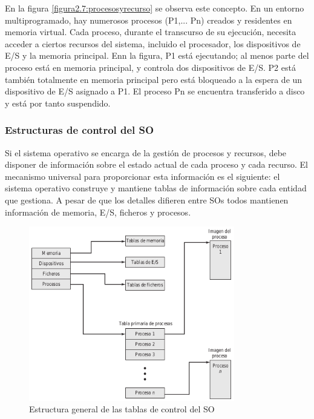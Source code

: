 \documentclass{article}
\begin{document}
			En la figura \ref{figura2.7:procesosyrecurso} se observa este concepto. En un entorno multiprogramado, hay numerosos procesos (P1,... Pn) creados y residentes en memoria virtual. Cada proceso, durante el transcurso de su ejecución, necesita acceder a ciertos recursos del sistema, incluido el procesador, los dispositivos de E/S y la memoria principal. Enn la figura, P1 está ejecutando; al menos parte del proceso está en memoria principal, y controla dos dispositivos de E/S. P2 está también totalmente en memoria principal pero está bloqueado a la espera de un dispositivo de E/S asignado a P1. El proceso Pn se encuentra transferido a disco y está por tanto suspendido.
			
			\subsubsection{Estructuras de control del SO}
				Si el sistema operativo se encarga de la gestión de procesos y recursos, debe disponer de información sobre el estado actual de cada proceso y cada recurso. El mecanismo universal para proporcionar esta información es el siguiente: el sistema operativo construye y mantiene tablas de información sobre cada entidad que gestiona. A pesar de que los detalles difieren entre SOs todos mantienen información de memoria, E/S, ficheros y procesos.
				
				\begin{figure}
				\caption{Estructura general de las tablas de control del SO}
				\label{figura2.8:tablasdecontrol}
				\centering
				\includegraphics[width=0.8\textwidth, scale=1]{tema_2_figura8.png}
				\end{figure}
				
\end{document}
